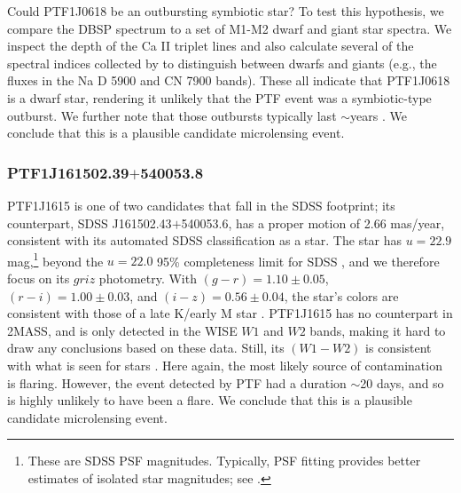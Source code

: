 \documentclass{emulateapj}
\begin{document}
Could PTF1J0618 be an outbursting symbiotic star? To test this hypothesis, we compare the DBSP spectrum to a set of M1-M2 dwarf and giant star spectra. We inspect the depth of the Ca II triplet lines and also calculate several of the spectral indices collected by \citet{kev06} to distinguish between dwarfs and giants (e.g., the fluxes in the Na D 5900 and CN 7900 bands). These all indicate that PTF1J0618 is a dwarf star, rendering it unlikely that the PTF event was a symbiotic-type outburst. We further note that those outbursts typically last $\sim$years \citep[e.g.,][]{tomov2013}. We conclude that this is a plausible candidate microlensing event.


\subsubsection*{PTF1J161502.39$+$540053.8} %
PTF1J1615 is one of two candidates that fall in the SDSS footprint; its counterpart, SDSS J161502.43$+$540053.6, has a proper motion of 2.66 mas/year, consistent with its automated SDSS classification as a star. The star has $u = 22.9$ mag,\footnote{These are SDSS PSF magnitudes. Typically, PSF fitting provides better estimates of isolated star magnitudes; see \citet{stoughton02}.} beyond the $u = 22.0$ 95\% completeness limit for SDSS \citep{stoughton02}, and we therefore focus on its $griz$ photometry. With $(g-r) = 1.10\pm0.05$, $(r-i) = 1.00\pm0.03$, and $(i-z) = 0.56\pm0.04$, the star's colors are consistent with those of a late K/early M star \citep{kev07}. PTF1J1615 has no counterpart in 2MASS, and is only detected in the WISE $W1$ and $W2$ bands, making it hard to draw any conclusions based on these data. Still, its $(W1-W2)$ is consistent with what is seen for stars \citep[cf.\ Figure 14 in][]{yan2013}. Here again, the most likely source of contamination is flaring. However, the event detected by PTF had a duration $\sim$20 days, and so is highly unlikely to have been a flare. We conclude that this is a plausible candidate microlensing event.
\end{document}
